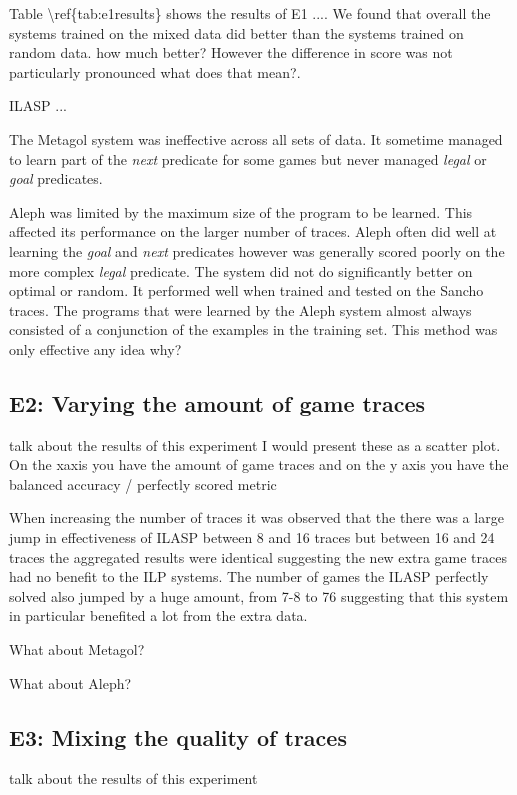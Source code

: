 \ac{Table \ref{tab:e1results} shows the results of E1 ....}
We found that overall the systems trained on the mixed data did better than the systems trained on random data.
\ac{how much better?}
However the difference in score was not particularly pronounced \ac{what does that mean?}.

\ac{ILASP ...}

The Metagol system was ineffective across all sets of data. It sometime managed to learn part of the \textit{next} predicate for some games but never managed \textit{legal} or \textit{goal} predicates.

Aleph was limited by the maximum size of the program to be learned. This affected its performance on the larger number of traces. Aleph often did well at learning the \textit{goal} and \textit{next} predicates however was generally scored poorly on the more complex \textit{legal} predicate. The system did not do significantly better on optimal or random. It performed well when trained and tested on the Sancho traces.
The programs that were learned by the Aleph system almost always consisted of a conjunction of the examples in the training set. This method was only effective \ac{any idea why?}


\subsection{E2: Varying the amount of game traces}
\ac{talk about the results of this experiment}
\ac{
	I would present these as a scatter plot. On the xaxis you have the amount of game traces and on the y axis you have the balanced accuracy / perfectly scored metric
}


When increasing the number of traces it was observed that the there was a large jump in effectiveness of ILASP between 8 and 16 traces but between 16 and 24 traces the aggregated results were identical suggesting the new extra game traces had no benefit to the ILP systems. The number of games the ILASP perfectly solved also jumped by a huge amount, from 7-8 to 76 suggesting that this system in particular benefited a lot from the extra data.

\ac{What about Metagol?}

\ac{What about Aleph?}


\subsection{E3: Mixing the quality of traces}
\ac{talk about the results of this experiment}










